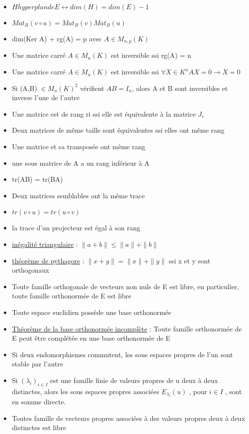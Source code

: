 \documentclass{book}
\begin{document}
\begin{itemize}[label=$\ast$]
	\item \( H hyperplan de E \leftrightarrow dim(H) = dim(E)-1 \)
	\item 	\( Mat_B(v \circ u) = Mat_B(v)Mat_B(u) \)
	\item dim(Ker A) + rg(A) = p avec \(A \in M_{n,p}(K)\)
	\item Une matrice carré \( A \in M_n(K) \) est inversible ssi rg(A) = n
	\item Une matrice carré \( A \in M_n(K) \) est inversible ssi \( \forall X \in K^n AX=0 \rightarrow X=0 \)
	\item Si (A,B) \( \in M_n(K)^2 \) vérifient \(AB = I_n\), alors A et B sont inversibles et inverse l'une de l'autre
	\item Une matrice est de rang ri ssi elle est équivalente à la matrice \( J_r \)
	\item Deux matrices de même taille sont équivalentes ssi elles ont même rang
	\item Une matrice et sa transposée ont même rang
	\item une sous matrice de A a un rang inférieur à A
	\item tr(AB) = tr(BA)
	\item Deux matrices semblables ont la même trace
	\item \(tr(v \circ u) = tr(u \circ v) \)
	\item la trace d'un projecteur est égal à son rang
	\item \underline{inégalité triangulaire} : \( \|a + b\| \leq \|a\| + \|b\| \)
	\item \underline{théorème de pythagore} : \( \|x + y\| = \|x\| + \|y\| \) ssi x et y sont orthogonaux
	\item Toute famille orthogonale de vecteurs non nuls de E est libre, en particulier, toute famille orthonormée de E est libre
	\item Toute espace euclidien possède une base orthonormée
	\item \underline{Théorème de la base orthonormée incomplète} : Toute famille orthonormée de E peut être complétée en une base orthonormée de E
	\item Si deux endomorphismes commutent, les sous espaces propres de l'un sont stable par l'autre
	\item Si \( (\lambda_i)_{i \in I} \) est une famille finie de valeurs propres de u deux à deux distinctes, alors les sous espaces propres associées \(E_{\lambda_{i}}(u)\) , pour \(i \in I \) , sont en somme directe.
	\item  Toutes famille de vecteurs propres associées à des valeurs propres deux à deux distinctes est libre

\end{itemize}
\end{document}

